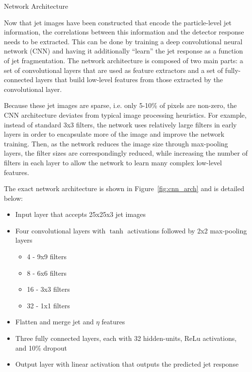 \begin{section}{Network Architecture}
\label{sec:network_arch}

Now that jet images have been constructed that encode the particle-level jet information, the correlations between this information and the detector response needs to be extracted.
This can be done by training a deep convolutional neural network (CNN) and having it additionally ``learn'' the jet response as a function of jet fragmentation.
The network architecture is composed of two main parts: a set of convolutional layers that are used as feature extractors and a set of fully-connected layers that build low-level features from those extracted by the convolutional layer.

Because these jet images are sparse, i.e. only 5-10\% of pixels are non-zero, the CNN architecture deviates from typical image processing heuristics.
For example, instead of standard 3x3 filters, the network uses relatively large filters in early layers in order to encapsulate more of the image and improve the network training.
Then, as the network reduces the image size through max-pooling layers, the filter sizes are correspondingly reduced, while increasing the number of filters in each layer to allow the network to learn many complex low-level features.

The exact network architecture is shown in Figure~\ref{fig:cnn_arch} and is detailed below:
\begin{itemize}
\item Input layer that accepts 25x25x3 jet images
\item Four convolutional layers with $\tanh$ activations followed by 2x2 max-pooling layers
  \begin{itemize}
  \item 4 - 9x9 filters
  \item 8 - 6x6 filters
  \item 16 - 3x3 filters
  \item 32 - 1x1 filters
  \end{itemize}
\item Flatten and merge jet \pT and $\eta$ features
\item Three fully connected layers, each with 32 hidden-units, ReLu activations, and 10\% dropout
\item Output layer with linear activation that outputs the predicted jet response
\end{itemize}


\end{section}
